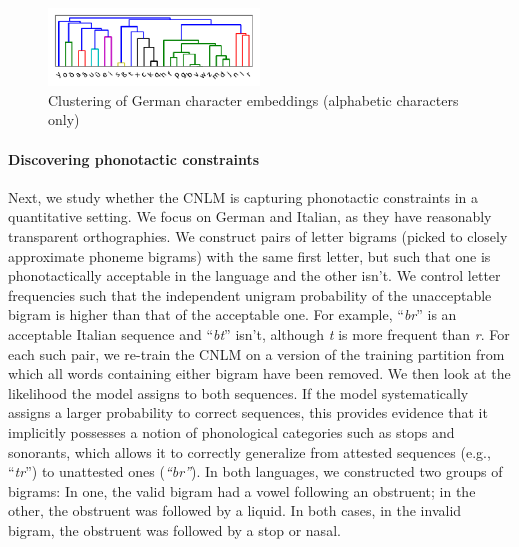 \begin{figure}
\includegraphics[width=0.50\textwidth]{figures/char-emb-clustering-output_output-phonetic-wiki-german-nospaces-bptt-910515909.pdf}
\caption{Clustering of German character embeddings (alphabetic characters only)}\label{fig:char-clustering}
\end{figure}



\paragraph{Discovering phonotactic constraints}
\label{sec:phonotactics}

Next, we study whether the CNLM is capturing phonotactic constraints
in a quantitative setting.  We focus on German and Italian, as they
have reasonably transparent orthographies.  We construct pairs of
letter bigrams (picked to closely approximate phoneme bigrams) with
the same first letter, but such that one is phonotactically acceptable
in the language and the other isn't. We control letter frequencies
such that the independent unigram probability of the unacceptable
bigram is higher than that of the acceptable one. For example,
``\emph{br}'' is an acceptable Italian sequence and ``\emph{bt}''
isn't, although \emph{t} is more frequent than \emph{r}.  For each
such pair, we re-train the CNLM on a version of the training partition
from which all words containing either bigram have been removed.  We
then look at the likelihood the model assigns to both sequences. If
the model systematically assigns a larger probability to correct
sequences, this provides evidence that it implicitly possesses a
notion of phonological categories such as stops and sonorants, which
allows it to correctly generalize from attested sequences (e.g.,
``\emph{tr}'') to unattested ones (\emph{``br''}). In both languages,
we constructed two groups of bigrams: In one, the valid bigram had a
vowel following an obstruent; in the other, the obstruent was followed by
a liquid.  In both cases, in the invalid bigram, the obstruent was followed by a
stop or nasal.  %

